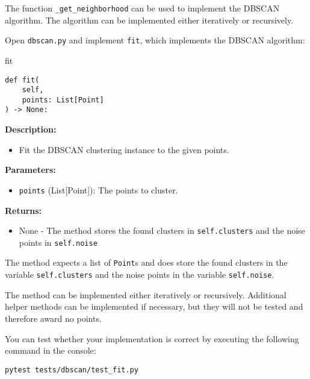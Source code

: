 \documentclass[
english,
smallborders
]{i6prcsht}
\begin{document}
The function \texttt{\_get\_neighborhood} can be used to implement the DBSCAN algorithm. The algorithm can be implemented either iteratively or recursively.

Open \texttt{dbscan.py} and implement \texttt{fit}, which implements the DBSCAN algorithm:

\vspace*{0.3cm}

\begin{functionbox}{fit}
	\begin{lstlisting}[numbers=none]
def fit(
    self, 
    points: List[Point]
) -> None:
\end{lstlisting}
	
	\textbf{Description:}
	\begin{itemize}[leftmargin=*,topsep=0pt]
		\item Fit the DBSCAN clustering instance to the given points.
	\end{itemize}
	
	\textbf{Parameters:}
	\begin{itemize}[leftmargin=*,topsep=0pt]
		\item \texttt{points} (List[Point]): The points to cluster.
	\end{itemize}
	
	\textbf{Returns:}
	\begin{itemize}[leftmargin=*,topsep=0pt]
		\item None - The method stores the found clusters in \texttt{self.clusters} and the noise points in \texttt{self.noise}
	\end{itemize}
\end{functionbox}

\vspace*{0.5cm}

The method expects a list of \texttt{Point}s and does store the found clusters in the variable \texttt{self.clusters} and the noise points in the variable \texttt{self.noise}. 

The method can be implemented either iteratively or recursively. Additional helper methods can be implemented if necessary, but they will not be tested and therefore award no points.

You can test whether your implementation is correct by executing the following command in the console:

\vspace*{0.3cm}

\begin{lstlisting}
pytest tests/dbscan/test_fit.py
\end{lstlisting}
\end{document}
